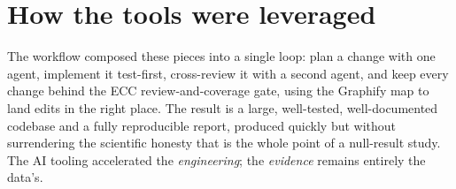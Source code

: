 \section{How the tools were leveraged}
The workflow composed these pieces into a single loop: plan a change with one agent,
implement it test-first, cross-review it with a second agent, and keep every change behind
the ECC review-and-coverage gate, using the Graphify map to land edits in the right place.
The result is a large, well-tested, well-documented codebase and a fully reproducible
report, produced quickly but without surrendering the scientific honesty that is the whole
point of a null-result study. The AI tooling accelerated the \emph{engineering}; the
\emph{evidence} remains entirely the data's.
